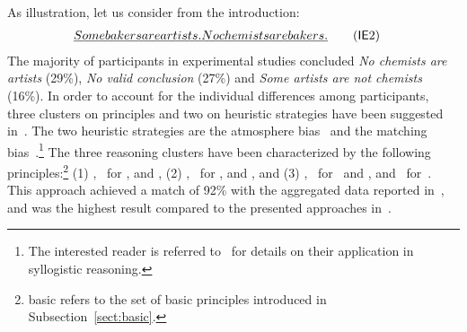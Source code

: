 \documentclass[12pt]{article}
\begin{document}
As illustration, let us consider \mbox{\MI{}} from the introduction: 
\begin{align}
 \emph{Some bakers are artists. } & \emph{No chemists are bakers.} \tag{\MI\ME 2} 
\end{align}
The majority of participants in experimental studies
concluded \emph{No chemists are artists} (29\;\%), \emph{No valid conclusion} (27\;\%)
and \emph{Some artists are not chemists} (16\;\%).
In order to account for the individual differences among participants, three clusters on principles and two on heuristic strategies have been suggested
in~\cite{declare:2017}. The two heuristic strategies are the atmosphere bias~\cite{woodworth:sells:1935} and the matching bias~\cite{Wetherick1995}.\footnote{
The interested reader is referred to~\cite{declare:2017} for details on their application in syllogistic reasoning. 
}
The three reasoning clusters have been characterized by the following principles:\footnote{{\footnotesize\textsf{basic}} refers to the set of basic principles introduced in Subsection~\ref{sect:basic}.} (1) \basic, \converse\ for \MI, and \abduction,
    (2) \basic, \converse\ for \MI, and \negFailure, and
    (3) \basic, \converse\ for \MI\ and \ME, and \contraposition\ for~\MA.
This approach achieved a match of 92\;\% with the aggregated data reported in~\cite{khemlani:2012}, and was the highest result compared to the presented approaches in~\cite{khemlani:2012}.
\end{document}
